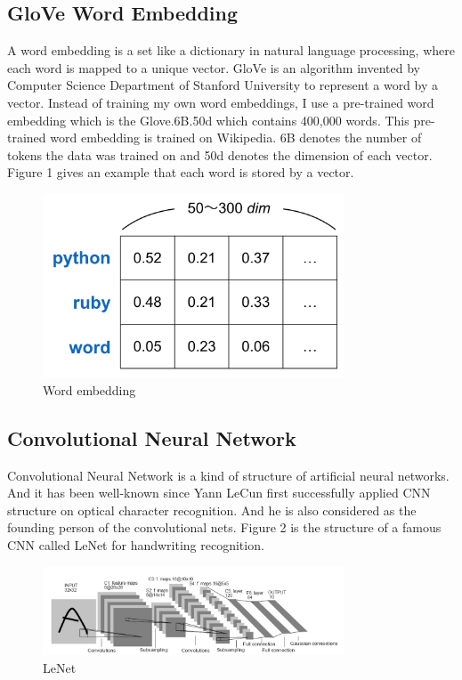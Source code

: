 \documentclass[12pt]{spieman}
\begin{document}
\begin{spacing}{1.5}
    \subsection{GloVe Word Embedding}
    A word embedding is a set like a dictionary in natural language processing, where each word is mapped to a unique vector. GloVe is an algorithm invented by Computer Science Department of Stanford University to represent a word by a vector. Instead of training my own word embeddings, I use a pre-trained word embedding which is the Glove.6B.50d which contains 400,000 words. This pre-trained word embedding is trained on Wikipedia. 6B denotes the number of tokens the data was trained on and 50d denotes the dimension of each vector. Figure 1 gives an example that each word is stored by a vector.
    \begin{figure}[h!]
    \centering
    \includegraphics[width=0.80\textwidth]{figures/word_embedding.png}
    \caption{Word embedding}
    \label{threadsVsSync}
    \end{figure}

    \subsection{Convolutional Neural Network}
    Convolutional Neural Network is a kind of structure of artificial neural networks. And it has been well-known since Yann LeCun first successfully applied CNN structure on optical character recognition. And he is also considered as the founding person of the convolutional nets. Figure 2 is the structure of a famous CNN called LeNet for handwriting recognition\cite{ref1}.
    \begin{figure}[h!]
    \centering
    \includegraphics[width=0.80\textwidth]{figures/lenet.png}
    \caption{LeNet}
    \label{threadsVsSync}
    \end{figure}


\end{spacing}
\end{document}
